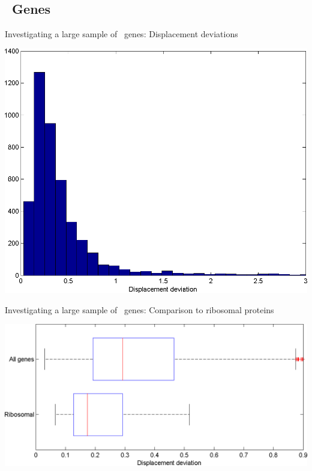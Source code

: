 \documentclass[11pt]{article}
\begin{document}
\subsection{\ecoli\ Genes}
\begin{cfigure}
  \parbox{0.4\linewidth}{
    \caption{Investigating a large sample of \ecoli\ genes: Displacement deviations}
    \label{ecoli:hist}
    \includegraphics[width=\linewidth]{histograms/everything}
  }
  \qquad
  \begin{minipage}{0.4\linewidth}
    \caption{Investigating a large sample of \ecoli\ genes: Comparison
      to ribosomal proteins}
    \label{ribosomal:comp}
    \includegraphics[width=\linewidth]{histograms/ribosomal}
  \end{minipage}
\end{cfigure}

\begin{cfigure}
\end{cfigure}
\end{document}
